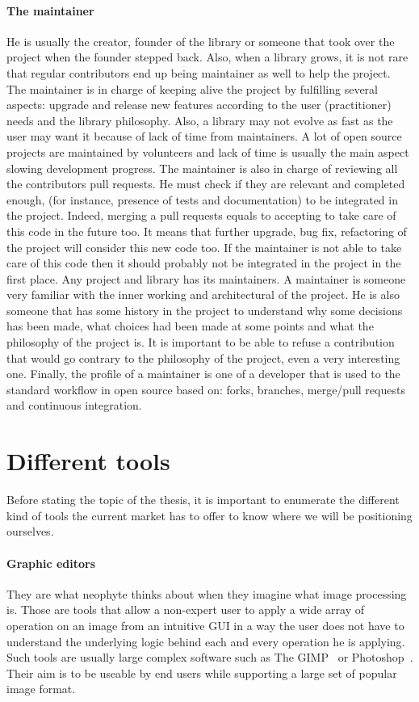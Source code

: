 \paragraph{The maintainer} He is usually the creator, founder of the library or someone that took over the project when
the founder stepped back. Also, when a library grows, it is not rare that regular contributors end up being maintainer
as well to help the project. The maintainer is in charge of keeping alive the project by fulfilling several aspects:
upgrade and release new features according to the user (practitioner) needs and the library philosophy. Also, a library
may not evolve as fast as the user may want it because of lack of time from maintainers. A lot of open source projects
are maintained by volunteers and lack of time is usually the main aspect slowing development progress. The maintainer is
also in charge of reviewing all the contributors pull requests. He must check if they are relevant and completed enough,
(for instance, presence of tests and documentation) to be integrated in the project. Indeed, merging a pull requests
equals to accepting to take care of this code in the future too. It means that further upgrade, bug fix, refactoring of
the project will consider this new code too. If the maintainer is not able to take care of this code then it should
probably not be integrated in the project in the first place. Any project and library has its maintainers. A maintainer
is someone very familiar with the inner working and architectural of the project. He is also someone that has some
history in the project to understand why some decisions has been made, what choices had been made at some points and
what the philosophy of the project is. It is important to be able to refuse a contribution that would go contrary to the
philosophy of the project, even a very interesting one. Finally, the profile of a maintainer is one of a developer that
is used to the standard workflow in open source based on: forks, branches, merge/pull requests and continuous
integration.

\section*{Different tools}

Before stating the topic of the thesis, it is important to enumerate the different kind of tools the current market has
to offer to know where we will be positioning ourselves.

\paragraph{Graphic editors} They are what neophyte thinks about when they imagine what image processing is. Those are
tools that allow a non-expert user to apply a wide array of operation on an image from an intuitive GUI in a way the
user does not have to understand the underlying logic behind each and every operation he is applying. Such tools are
usually large complex software such as The GIMP~\parencite{gimp.2019} or Photoshop~\parencite{adobe.2019.photoshop}.
Their aim is to be useable by end users while supporting a large set of popular image format.

